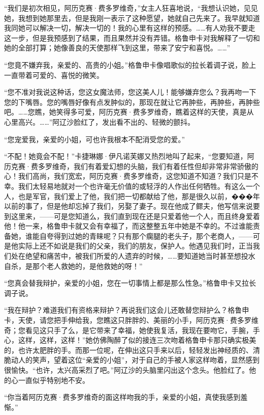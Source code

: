 \par “我们是初次相见，阿历克赛·费多罗维奇，”女主人狂喜地说，“我想认识她，见见她，我想到她那里去，但是我刚一表示了这种愿望，她就自己先来了。我早就知道我同她可以解决一切，解决一切的！我的心里有这样的预感。……有人劝我不要走这一步，但是我预感到了结果，而且果然并没有弄错。格鲁申卡对我解释了一切和她的全部打算；她像善良的天使那样飞到这里，带来了安宁和喜悦。……”
\par “您竟不嫌弃我，亲爱的、高贵的小姐。”格鲁申卡像唱歌似的拉长着调子说，脸上一直带着可爱的、喜悦的微笑。
\par “您不准对我说这种话，您这女魔法师，您这美人儿！能够嫌弃您么？我再吻一下您的下嘴唇。您的嘴唇好像有点发肿似的，那现在就让它再肿些，再肿些，再肿些吧。……您瞧，她笑得多可爱，阿历克赛·费多罗维奇，瞧着这样的天使，真是从心里高兴。……”阿辽沙脸红了，发出看不出的、轻微的颤抖。
\par “您宠爱我，亲爱的小姐，可也许我根本不配消受您的爱。”
\par “不配！她竟会不配！”卡捷琳娜·伊凡诺芙娜又热烈地叫了起来，“您要知道，阿历克赛·费多罗维奇，我们有着爱幻想的头脑，我们有着任性但却非常非常骄傲的心！我们高尚，我们宽宏，阿历克赛·费多罗维奇，这您知道不知道？我们只是不幸。我们太轻易地就对一个也许毫无价值的或轻浮的人作出任何牺牲。有这么一个人，也是军官，我们爱上了他，我们把一切都献给了他，那是很久以前，���年以前的事了，但是他却忘掉了我们，另娶了妻子。现在他成了鳏夫，他写信来说要到这里来，——可是您知道么，我们直到现在还是只爱着他一个人，而且终身爱着他！他一来，格鲁申卡就又会有幸福了，而这整整五年中她是不幸的。不过谁能责备她，谁能自夸得到过她的青睐呢？只有那个瘸腿的老头子，那个老商人，——可是他实际上还不如说是我们的父亲，我们的朋友，保护人。他遇见我们时，正当我们处在绝望和痛苦中，被我们所爱的人遗弃的时候，……要知道她当时甚至想投水自杀，是那个老人救她的，是他救她的呀！”
\par “您真会替我辩护，亲爱的小姐，您在一切事情上都是那么性急。”格鲁申卡又拉长调子说。
\par “我在辩护？难道我们有资格来辩护？再说我们这会儿还敢替您辩护么？格鲁申卡，天使，请您把手伸给我，您瞧这只胖胖的、美丽的小手，阿历克赛·费多罗维奇；您看见这只手了么，是它带来了幸福，她使我复活，我现在要吻它，手腕，手心，这样，这样，这样！”她仿佛陶醉了似的接连三次吻着格鲁申卡那只确实极美的，也许太肥胖的手。而那一位呢，在伸出这只手来以后，轻轻发出神经质的、清脆动人的笑声，望着这位“亲爱的小姐”，对于自己的手被人家这样吻着，显然感到很愉快。“也许，太兴高采烈了吧。”阿辽沙的头脑里闪出这个念头。他脸红了。他的心一直似乎特别地不安。
\par “你当着阿历克赛·费多罗维奇的面这样吻我的手，亲爱的小姐，真使我感到羞惭。”

